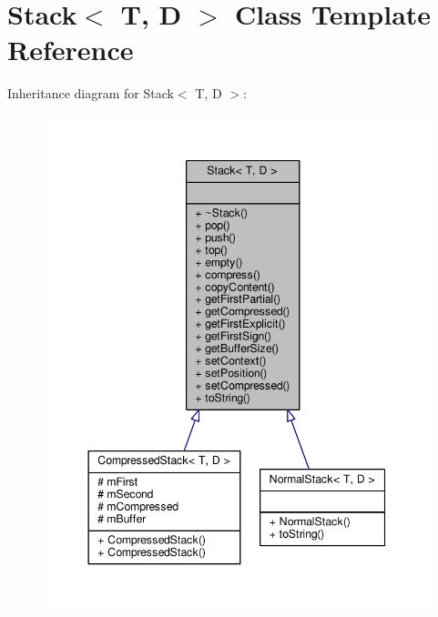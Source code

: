 \hypertarget{class_stack}{}\section{Stack$<$ T, D $>$ Class Template Reference}
\label{class_stack}


Inheritance diagram for Stack$<$ T, D $>$\+:
\nopagebreak
\begin{figure}[H]
\begin{center}
\leavevmode
\includegraphics[width=344pt]{class_stack__inherit__graph}
\end{center}
\end{figure}


